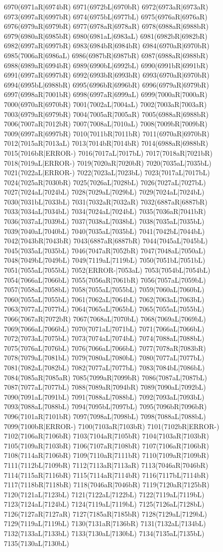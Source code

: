 6970(6971aR|6974bR) 6971(6972bL|6970bR) 6972(6973aR|6973aR) 6973(6997aR|6997bR) 6974(6975bL|6977bL) 6975(6976aR|6976aR) 6976(6979aR|6979bR) 6977(6978aR|6978aR) 6978(6988aR|6988bR) 6979(6980aR|6985bR) 6980(6981aL|6983aL) 6981(6982bR|6982bR) 6982(6997aR|6997bR) 6983(6984bR|6984bR) 6984(6970aR|6970bR) 6985(7006aR|6986aL) 6986(6987bR|6987bR) 6987(6988aR|6988bR) 6988(6989aR|6994bR) 6989(6990bL|6992bL) 6990(6991bR|6991bR) 6991(6997aR|6997bR) 6992(6993bR|6993bR) 6993(6970aR|6970bR) 6994(6995bL|6988bR) 6995(6996bR|6996bR) 6996(6979aR|6979bR) 6997(6998aR|7001bR) 6998(6997aR|6999aL) 6999(7000aR|7000aR) 7000(6970aR|6970bR) 7001(7002aL|7004aL) 7002(7003aR|7003aR) 7003(6979aR|6979bR) 7004(7005aR|7005aR) 7005(6988aR|6988bR) 7006(7007aR|7012bR) 7007(7008aL|7010aL) 7008(7009bR|7009bR) 7009(6997aR|6997bR) 7010(7011bR|7011bR) 7011(6970aR|6970bR) 7012(7015aR|7013aL) 7013(7014bR|7014bR) 7014(6988aR|6988bR) 7015(7016bR|ERROR-) 7016(7017aL|7017bL) 7017(7018aR|7021bR) 7018(7019aL|ERROR-) 7019(7020aR|7020bR) 7020(7035aL|7035bL) 7021(7022aL|ERROR-) 7022(7023aL|7023bL) 7023(7017aL|7017bL) 7024(7025aR|7030bR) 7025(7026aL|7028bL) 7026(7027aL|7027bL) 7027(7024aL|7024bL) 7028(7029aL|7029bL) 7029(7024aL|7024bL) 7030(7031bL|7033bL) 7031(7032aR|7032aR) 7032(6887aR|6887bR) 7033(7034aL|7034bL) 7034(7024aL|7024bL) 7035(7036aR|7041bR) 7036(7037aL|7039bL) 7037(7038aL|7038bL) 7038(7035aL|7035bL) 7039(7040aL|7040bL) 7040(7035aL|7035bL) 7041(7042bL|7044bL) 7042(7043bR|7043bR) 7043(6887aR|6887bR) 7044(7045aL|7045bL) 7045(7035aL|7035bL) 7046(7047aR|7052bR) 7047(7048aL|7050aL) 7048(7049bL|7049bL) 7049(7119aL|7119bL) 7050(7051bL|7051bL) 7051(7055aL|7055bL) 7052(ERROR-|7053aL) 7053(7054bL|7054bL) 7054(7066aL|7066bL) 7055(7056aR|7061bR) 7056(7057aL|7059bL) 7057(7058aL|7058bL) 7058(7055aL|7055bL) 7059(7060aL|7060bL) 7060(7055aL|7055bL) 7061(7062aL|7064bL) 7062(7063aL|7063bL) 7063(7077aL|7077bL) 7064(7065aL|7065bL) 7065(7055aL|7055bL) 7066(7067aR|7072bR) 7067(7068aL|7070bL) 7068(7069aL|7069bL) 7069(7066aL|7066bL) 7070(7071aL|7071bL) 7071(7066aL|7066bL) 7072(7073aL|7075bL) 7073(7074aL|7074bL) 7074(7088aL|7088bL) 7075(7076aL|7076bL) 7076(7066aL|7066bL) 7077(7078aR|7083bR) 7078(7079aL|7081bL) 7079(7080aL|7080bL) 7080(7077aL|7077bL) 7081(7082aL|7082bL) 7082(7077aL|7077bL) 7083(7084bL|7086bL) 7084(7085aR|7085aR) 7085(7099aR|7099bR) 7086(7087aL|7087bL) 7087(7077aL|7077bL) 7088(7089aR|7094bR) 7089(7090aL|7092bL) 7090(7091aL|7091bL) 7091(7088aL|7088bL) 7092(7093aL|7093bL) 7093(7088aL|7088bL) 7094(7095bL|7097bL) 7095(7096bR|7096bR) 7096(7101aR|7101bR) 7097(7098aL|7098bL) 7098(7088aL|7088bL) 7099(7100bR|ERROR-) 7100(7103aR|7103bR) 7101(7102bR|ERROR-) 7102(7106aR|7106bR) 7103(7104aR|7105bR) 7104(7103aR|7103bR) 7105(7109aR|7103bR) 7106(7107aR|7108bR) 7107(7106aR|7106bR) 7108(7114aR|7106bR) 7109(7110aR|7111bR) 7110(7109aR|7109bR) 7111(7112bL|7109bR) 7112(7113aR|7113aR) 7113(7046aR|7046bR) 7114(7115aR|7116bR) 7115(7114aR|7114bR) 7116(7117bL|7114bR) 7117(7118bR|7118bR) 7118(7046aR|7046bR) 7119(7120aR|7125bR) 7120(7121aL|7123bL) 7121(7122aL|7122bL) 7122(7119aL|7119bL) 7123(7124aL|7124bL) 7124(7119aL|7119bL) 7125(7126aL|7128bL) 7126(7127aR|7127aR) 7127(7185aR|7185bR) 7128(7129aL|7129bL) 7129(7119aL|7119bL) 7130(7131aR|7136bR) 7131(7132aL|7134bL) 7132(7133aL|7133bL) 7133(7130aL|7130bL) 7134(7135aL|7135bL) 7135(7130aL|7130bL) 